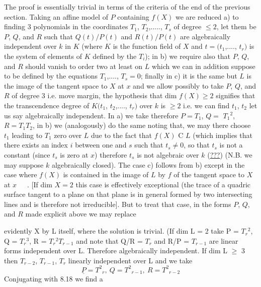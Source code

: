\documentclass[11pt]{article}
\newcommand{\scanpage}[1]{\par\bigskip\noindent{\small\sffamily[scan #1]}\par}
\newcommand{\mspage}[1]{{\small\sffamily[p.\,#1]}}
\newcommand{\uline}[1]{\underline{#1}}
\begin{document}
The proof is essentially trivial in terms of the criteria of
the end of the previous section. Taking an affine model of $P$
containing $f(X)$ we are reduced a) to finding 3 polynomials in the
coordinates $T_1$, $T_2$,....., $T_s$ of degree $\leq 2$, let them be $P$, $Q$, and $R$
such that $Q(t)/P(t)$ and $R(t)/P(t)$ are algebraically independent
over $k$ in $K$ (where $K$ is the function field of $X$ and $t = (t_1$,....,
$t_r)$ is the system of elements of $K$ defined by the $T_i$); in b) we
require also that $P$, $Q$, and $R$ should vanish to order two at least
on $L$ which we can in addition suppose to be defined by the
equations $T_1$,...., $T_s = 0$; finally in c) it is the same but $L$ is
the image of the tangent space to $X$ at $x$ and we allow possibly to
take $P$, $Q$, and $R$ of degree 3 i.e. move margin, the hypothesis that
dim $f(X) \geq 2$ signifies that the transcendence degree of $K(t_1$,
$t_2$,...., $t_r)$ over $k$ is $\geq 2$ i.e. we can find $t_1$, $t_2$ let us say
algebraically independent. In a) we take therefore $P = T_1$, $Q =$
$T_1{}^2$, $R = T_1T_2$, in b) we (analogously) do the same noting that, we
may there choose $t_1$ leading to $T_1$ zero over $L$ due to the fact that
$f(X)$ C $L$ (which implies that there exists an index $i$ between one
and $s$ such that $t_s \neq 0$, so that $t_s$ is not a constant (since $t_s$ is
zero at $x$) therefore $t_s$ is not algebraic over $k$ (\uline{???}) (N.B. we may
suppose $k$ algebraically closed). The case c) follows from b)
except in the case where $f(X)$ is contained in the image of $L$ by $f$
of the tangent space to $X$ at $x$\ \ \ . [If dim $X = 2$ this case is
effectively exceptional (the trace of a quadric surface tangent to
a plane on that plane is in general formed by two intersecting
lines and is therefore not irreducible]. But to treat that case,
in the forms $P$, $Q$, and $R$ made explicit above we may replace

\clearpage
\scanpage{24/66}
\mspage{66}

evidently X by L itself, where the solution is trivial.  (If dim L
= 2 take P = $T_r{}^2$, Q = $T_r{}^3$, R = $T_r{}^2T_{r-1}$ and note that Q/R = $T_r$ and R/P
= $T_{r-1}$ are linear forms independent over L.  Therefore
algebraically independent.  If dim L $\geq$ 3 then $T_{r-2}$, $T_{r-1}$, $T_r$
linearly independent over L and we take
\[ \underline{P} = {T^2}_r, \ Q = {T^2}_{r-1}, \ R = {T^2}_{r-2} \]
Conjugating with 8.18 we find a
\end{document}
